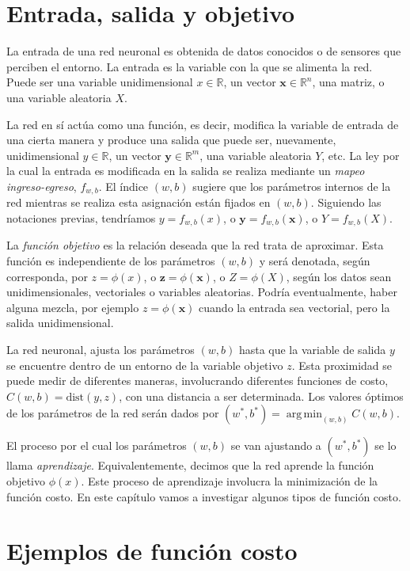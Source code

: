 \documentclass[12pt, a4paper]{amsbook}
\def\argmin{\operatorname {\mathrm{arg\, min}}}
\newcommand{\R}{{\mathbb R}}
\newcommand{\xx}{{\mathbf x}}
\newcommand{\yy}{{\mathbf y}}
\newcommand{\zz}{{\mathbf z}}
\theoremstyle{remark}
\theoremstyle{definition}
\numberwithin{section}{chapter}
\numberwithin{subsection}{section}
\numberwithin{equation}{section}
\numberwithin{figure}{chapter}
\begin{document}
\section{Entrada, salida y objetivo}\label{sec.c3.1}

La entrada de una red neuronal es obtenida de datos conocidos o de sensores que perciben el entorno. La entrada es la variable con la que se alimenta la red. Puede ser una variable unidimensional $x\in\R$, un vector $\xx\in \R^n$, una matriz, o una variable aleatoria $X$.

La red en sí actúa como una función, es decir, modifica la variable de entrada de una cierta manera y produce una salida que puede ser, nuevamente, unidimensional $y\in\R$, un vector $\yy\in \R^m$, una variable aleatoria $Y$, etc. La ley por la cual la entrada es modificada en la salida se realiza mediante un {\em mapeo ingreso-egreso}, $f_{w,b}$. El índice $(w, b)$ sugiere que los parámetros internos de la red mientras se realiza esta asignación están fijados en $(w, b)$. Siguiendo las notaciones previas, tendríamos $y=f_{w, b}(x)$, o $\yy = f_{w, b}(\xx)$, o $Y=f_{w, b}(X)$.

La {\em función objetivo} es la relación deseada que la red trata de aproximar. Esta función es independiente de los parámetros $(w, b)$ y será denotada, según corresponda, por $z=\phi(x)$, o $\zz = \phi(\xx)$, o $Z=\phi(X)$, según los datos sean unidimensionales, vectoriales o variables aleatorias. Podría eventualmente, haber alguna mezcla, por ejemplo $z=\phi(\xx)$ cuando la entrada sea vectorial, pero la salida unidimensional.

La red neuronal, ajusta los parámetros $(w, b)$ hasta que la variable de salida $y$ se encuentre dentro de un entorno de la variable objetivo $z$. Esta proximidad se puede medir de diferentes maneras, involucrando diferentes funciones de costo, $C(w, b)=\text{dist}(y, z)$, con una distancia a ser determinada. Los valores óptimos de los parámetros de la red serán dados por $(w^*, b^*)=\argmin_{(w, b)} C(w, b)$.

El proceso por el cual los parámetros $(w, b)$ se van ajustando a $(w^*, b^*)$ se lo llama {\em aprendizaje}. Equivalentemente, decimos que la red aprende la función objetivo $\phi(x)$. Este proceso de aprendizaje involucra la minimización de la función costo. En este capítulo vamos a investigar algunos tipos de función costo.


\section{Ejemplos de función costo}\label{sec.c3.2}
\end{document}
